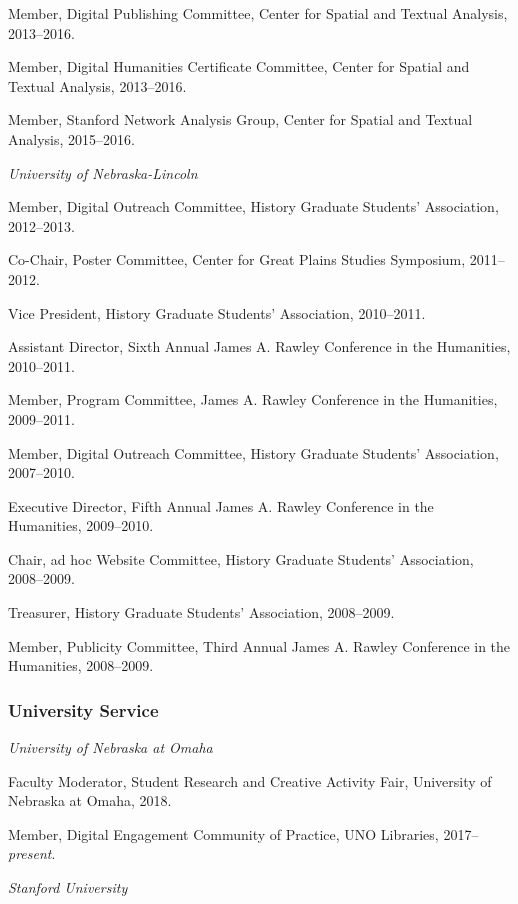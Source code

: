 Member, Digital Publishing Committee, Center for Spatial and Textual
Analysis, 2013--2016.

Member, Digital Humanities Certificate Committee, Center for Spatial and
Textual Analysis, 2013--2016.

Member, Stanford Network Analysis Group, Center for Spatial and Textual
Analysis, 2015--2016.

\vspace{.4cm}

\emph{University of Nebraska-Lincoln}

Member, Digital Outreach Committee, History Graduate Students'
Association, 2012--2013.

Co-Chair, Poster Committee, Center for Great Plains Studies Symposium,
2011--2012.

Vice President, History Graduate Students' Association, 2010--2011.

Assistant Director, Sixth Annual James A. Rawley Conference in the
Humanities, 2010--2011.

Member, Program Committee, James A. Rawley Conference in the Humanities,
2009--2011.

Member, Digital Outreach Committee, History Graduate Students'
Association, 2007--2010.

Executive Director, Fifth Annual James A. Rawley Conference in the
Humanities, 2009--2010.

Chair, ad hoc Website Committee, History Graduate Students' Association,
2008--2009.

Treasurer, History Graduate Students' Association, 2008--2009.

Member, Publicity Committee, Third Annual James A. Rawley Conference in
the Humanities, 2008--2009.

\subsubsection{University Service}\label{university-service}

\emph{University of Nebraska at Omaha}

Faculty Moderator, Student Research and Creative Activity Fair,
University of Nebraska at Omaha, 2018.

Member, Digital Engagement Community of Practice, UNO Libraries,
2017--\emph{present}.

\vspace{.4cm}

\emph{Stanford University}

